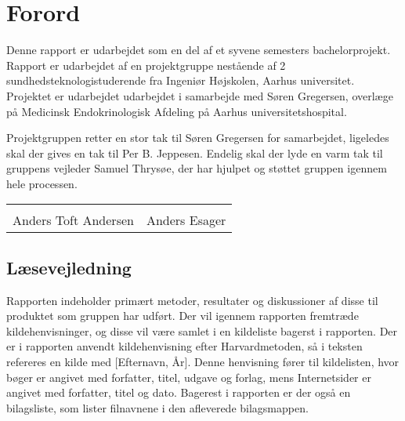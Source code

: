 \chapter*{Forord}

Denne rapport er udarbejdet som en del af et syvene semesters bachelorprojekt. Rapport er udarbejdet af en projektgruppe nestående af 2 sundhedsteknologistuderende fra Ingeniør Højskolen, Aarhus universitet. Projektet er udarbejdet udarbejdet i samarbejde med Søren Gregersen, overlæge på Medicinsk Endokrinologisk Afdeling på Aarhus universitetshospital. 

Projektgruppen retter en stor tak til Søren Gregersen for samarbejdet, ligeledes skal der gives en tak til Per B. Jeppesen. Endelig skal der lyde en varm tak til gruppens vejleder Samuel Thrysøe, der har hjulpet og støttet gruppen igennem hele processen.






\phantom{Luft}

\phantom{Luft}

\begin{table}[H]
	\centering
		\begin{tabular}{c c}
			\underline{\phantom{mmmmmmmmmmmmmm}} & \underline{\phantom{mmmmmmmmmmmmmm}}  \\
			Anders Toft Andersen			& Anders Esager		 			\\ 										\end{tabular}
\end{table}

\section{Læsevejledning}
Rapporten indeholder primært metoder, resultater og diskussioner af disse til produktet som gruppen har udført. Der vil igennem rapporten fremtræde kildehenvisninger, og disse vil være samlet i en kildeliste bagerst i rapporten. Der er i rapporten anvendt kildehenvisning efter Harvardmetoden, så i teksten refereres en kilde med [Efternavn, År]. Denne henvisning fører til kildelisten, hvor bøger er angivet med forfatter, titel, udgave og forlag, mens Internetsider er angivet med forfatter, titel og dato. Bagerest i rapporten er der også en bilagsliste, som lister filnavnene i den afleverede bilagsmappen.

